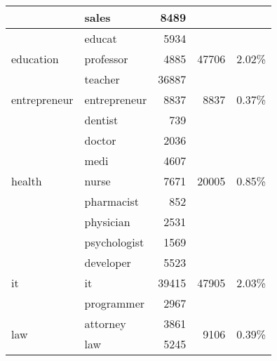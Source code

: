 \begin{table}[!htb]
\begin{tabular}{|l|l|r|r|r|}
                           & sales           & 8489    &                         &                          \\ \hline
\multirow{3}{*}{education} & educat          & 5934    & \multirow{3}{*}{47706}  & \multirow{3}{*}{2.02\%}  \\ \cline{2-3}
                           & professor       & 4885    &                         &                          \\ \cline{2-3}
                           & teacher         & 36887   &                         &                          \\ \hline
entrepreneur               & entrepreneur    & 8837    & 8837                    & 0.37\%                   \\ \hline
\multirow{7}{*}{health}    & dentist         & 739     & \multirow{7}{*}{20005}  & \multirow{7}{*}{0.85\%}  \\ \cline{2-3}
                           & doctor          & 2036    &                         &                          \\ \cline{2-3}
                           & medi            & 4607    &                         &                          \\ \cline{2-3}
                           & nurse           & 7671    &                         &                          \\ \cline{2-3}
                           & pharmacist      & 852     &                         &                          \\ \cline{2-3}
                           & physician       & 2531    &                         &                          \\ \cline{2-3}
                           & psychologist    & 1569    &                         &                          \\ \hline
\multirow{3}{*}{it}        & developer       & 5523    & \multirow{3}{*}{47905}  & \multirow{3}{*}{2.03\%}  \\ \cline{2-3}
                           & it              & 39415   &                         &                          \\ \cline{2-3}
                           & programmer      & 2967    &                         &                          \\ \hline
\multirow{2}{*}{law}       & attorney        & 3861    & \multirow{2}{*}{9106}   & \multirow{2}{*}{0.39\%}  \\ \cline{2-3}
                           & law             & 5245    &                         &                          \\ \hline

\end{tabular}
\end{table}
